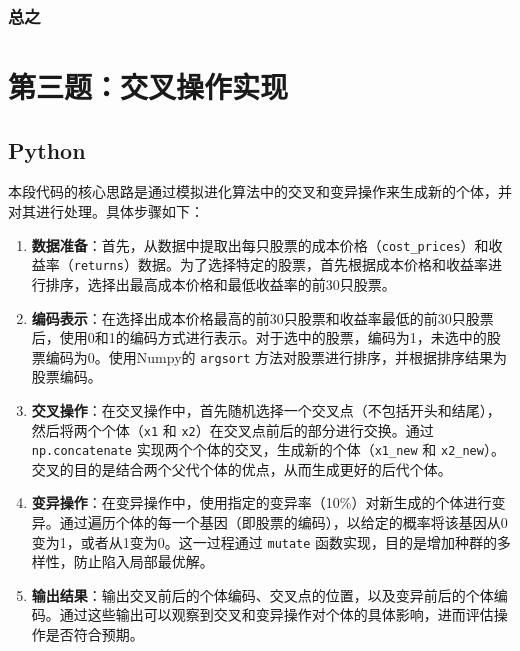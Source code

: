 \documentclass[journal,twoside,web]{ieeecolor}
\begin{document}
\subsubsection*{总之}

\section{第三题：交叉操作实现}
\subsection{Python}
本段代码的核心思路是通过模拟进化算法中的交叉和变异操作来生成新的个体，并对其进行处理。具体步骤如下：

\begin{enumerate}
    \item \textbf{数据准备}：首先，从数据中提取出每只股票的成本价格（\texttt{cost\_prices}）和收益率（\texttt{returns}）数据。为了选择特定的股票，首先根据成本价格和收益率进行排序，选择出最高成本价格和最低收益率的前30只股票。
    
    \item \textbf{编码表示}：在选择出成本价格最高的前30只股票和收益率最低的前30只股票后，使用0和1的编码方式进行表示。对于选中的股票，编码为1，未选中的股票编码为0。使用Numpy的 \texttt{argsort} 方法对股票进行排序，并根据排序结果为股票编码。
    
    \item \textbf{交叉操作}：在交叉操作中，首先随机选择一个交叉点（不包括开头和结尾），然后将两个个体（\texttt{x1} 和 \texttt{x2}）在交叉点前后的部分进行交换。通过 \texttt{np.concatenate} 实现两个个体的交叉，生成新的个体（\texttt{x1\_new} 和 \texttt{x2\_new}）。交叉的目的是结合两个父代个体的优点，从而生成更好的后代个体。
    
    \item \textbf{变异操作}：在变异操作中，使用指定的变异率（10\%）对新生成的个体进行变异。通过遍历个体的每一个基因（即股票的编码），以给定的概率将该基因从0变为1，或者从1变为0。这一过程通过 \texttt{mutate} 函数实现，目的是增加种群的多样性，防止陷入局部最优解。
    
    \item \textbf{输出结果}：输出交叉前后的个体编码、交叉点的位置，以及变异前后的个体编码。通过这些输出可以观察到交叉和变异操作对个体的具体影响，进而评估操作是否符合预期。
\end{enumerate}
\end{document}

